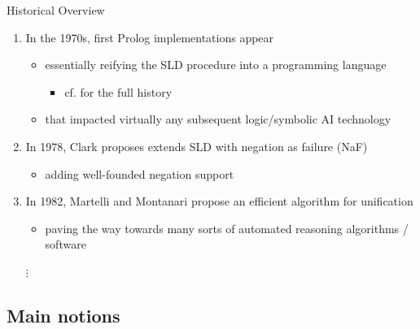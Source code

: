 \documentclass[presentation]{beamer}\mode<presentation>{\usetheme{AMSBolognaFC}}
\begin{document}
\begin{frame}[allowframebreaks]{Historical Overview}
\begin{enumerate}
        \bigskip

        \item In the 1970s, first Prolog implementations appear
        \begin{itemize}
            \item essentially reifying the SLD procedure into a programming language
            \begin{itemize}
                \item cf. \cite{Korner2022} for the full history
            \end{itemize}
            \item that impacted virtually any subsequent logic/symbolic AI technology
        \end{itemize}

        \framebreak

        \item In 1978, Clark proposes extends SLD with \alert{negation as failure} (NaF)
        \begin{itemize}
            \item adding well-founded negation support
        \end{itemize}

        \bigskip

        \item In 1982, Martelli and Montanari propose an efficient algorithm for unification
        \begin{itemize}
            \item paving the way towards many sorts of automated reasoning algorithms / software
        \end{itemize}

        \bigskip

        \item[$\vdots$]

    \end{enumerate}
\end{frame}

\subsection{Main notions}
\end{document}
